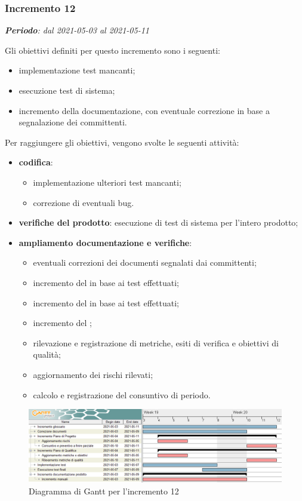 \subsubsection{Incremento 12}
\textit{\textbf{Periodo}: dal 2021-05-03 al 2021-05-11}

Gli obiettivi definiti per questo incremento sono i seguenti:
\begin{itemize}
\item implementazione test mancanti;
\item esecuzione test di sistema;
\item incremento della documentazione, con eventuale correzione in base a segnalazione dei committenti.
\end{itemize}

Per raggiungere gli obiettivi, vengono svolte le seguenti attività:
\begin{itemize}
\item \textbf{codifica}: 
\begin{itemize}
\item implementazione ulteriori test mancanti;
\item correzione di eventuali bug.
\end{itemize} 

\item \textbf{verifiche del prodotto}: esecuzione di test di sistema per l'intero prodotto;

\item \textbf{ampliamento documentazione e verifiche}:
\begin{itemize}
\item eventuali correzioni dei documenti segnalati dai committenti;
\item incremento del  in base ai test effettuati;
\item incremento del  in base ai test effettuati;
\item incremento del ;
\item rilevazione e registrazione di metriche, esiti di verifica e obiettivi di qualità;
\item aggiornamento dei rischi rilevati;
\item calcolo e registrazione del consuntivo di periodo.
\end{itemize}

\end{itemize}
\begin{figure}[H]
\centering

\centerline{\includegraphics[scale=0.6]{res/Pianificazione/Fasi/VerificaIncrementi/ganttIncremento12}}
\caption{Diagramma di Gantt per l'incremento 12}
\end{figure}